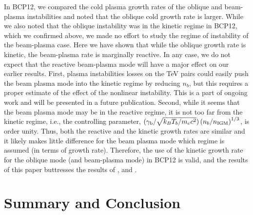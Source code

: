 \documentclass[usenatbib,iop,apj,numberedappendix]{aeb_emulateapj_2015}
\def\nIGM{n_{\rm IGM}}
\newcommand{\gammabeam}{\ensuremath{\gamma_{\rm b}}}
\begin{document}
In BCP12, we compared the cold plasma growth rates of the oblique and beam-plasma instabilities and noted that the oblique cold growth rate is larger.  While we also noted that the oblique instability was in the kinetic regime in BCP12, which we confirmed above, we made no effort to study the regime of instability of the beam-plasma case.  Here we have shown that while the oblique growth rate is kinetic, the beam-plasma rate is marginally reactive.
In any case, we do not expect that the reactive beam-plasma mode will have a major effect on our earlier results.  First, plasma instabilities losses on the TeV pairs could easily push the beam plasma mode into the kinetic regime by reducing $n_b$, but this requires a proper estimate of the effect of the nonlinear instability.  This is a part of ongoing work and will be presented in a future publication. Second, while it seems that the beam plasma mode may be in the reactive regime, it is not too far from the kinetic regime, i.e., the controlling parameter, $({\gammabeam}/{\sqrt{k_BT_b/m_e c^2}})\left({n_b}/{\nIGM}\right)^{1/3}$, is order unity.  Thus, both the reactive and the kinetic growth rates are similar and it likely makes little difference for the beam plasma mode which regime is assumed (in terms of growth rate).  Therefore, the use of the kinetic growth rate for the oblique mode (and beam-plasma mode) in BCP12 is valid, and the results of this paper buttresses the results of \citet{paperI,paperII,paperIII,paperIV}, and \citet{2015ApJ...811...19L}.



\section{Summary and Conclusion}\label{sec:conclusions}
\end{document}
